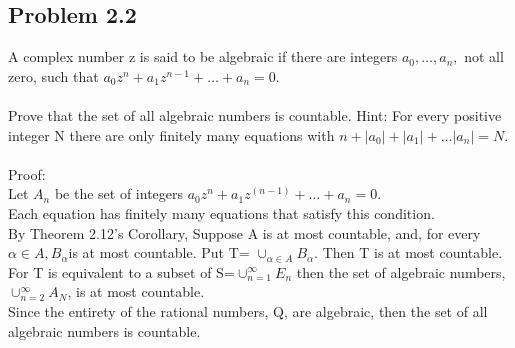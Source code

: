 \begin{figure}[h]\end{figure} 
\newpage
\subsection{Problem 2.2}
A complex number z is said to be algebraic if there are integers $a_0, \dots, a_n,$ not all zero, such that $a_0 z^n + a_1 z^{n-1}+ \dots + a_n=0.$ \\ 
\\
Prove that the set of all algebraic numbers is countable. Hint: For every positive integer N there are only finitely many equations with $n+|a_0|+|a_1| + \dots |a_n|= N.$\\ 
\\
Proof:\\ 
Let $A_n$ be the set of integers $a_0 z^n + a_1 z^(n-1)+ \dots + a_n=0.$ \\ 
Each equation has finitely many equations that satisfy this condition. \\ 
By Theorem 2.12's Corollary, Suppose A is at most countable, and, for every $\alpha \in A, B_\alpha$is at most countable. Put T= $ \cup_{\alpha \in A}B_\alpha.$ Then T is at most countable. For T is equivalent to a subset of S=$\cup_{n=1}^\infty E_n$ then the set of algebraic numbers, $\cup_{n=2}^\infty A_N$, is at most countable. \\ 
Since the entirety of the rational numbers, Q, are algebraic, then the set of all algebraic numbers is countable. 


